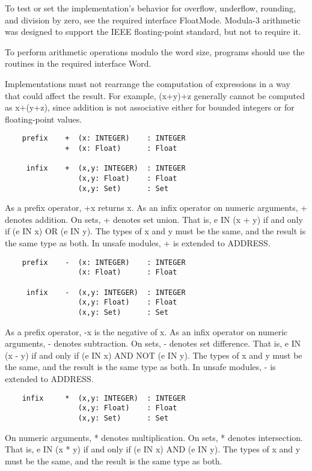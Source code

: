 \documentclass[10pt]{article}
\begin{document}
To test or set the implementation's behavior for overflow, underflow,
rounding, and division by zero, see the required interface FloatMode. Modula-3
arithmetic was designed to support the IEEE floating-point standard, but not
to require it.

To perform arithmetic operations modulo the word size, programs should use the
routines in the required interface Word.

Implementations must not rearrange the computation of expressions in a way
that could affect the result. For example, (x+y)+z generally cannot be
computed as x+(y+z), since addition is not associative either for bounded
integers or for floating-point values.

\begin{verbatim}
    prefix    +  (x: INTEGER)    : INTEGER
              +  (x: Float)      : Float

     infix    +  (x,y: INTEGER)  : INTEGER
                 (x,y: Float)    : Float
                 (x,y: Set)      : Set
\end{verbatim}
As a prefix operator, +x returns x. As an infix operator on numeric arguments,
+ denotes addition. On sets, + denotes set union. That is, e IN (x + y) if and
only if (e IN x) OR (e IN y). The types of x and y must be the same, and the
result is the same type as both. In unsafe modules, + is extended to ADDRESS.

\begin{verbatim}
    prefix    -  (x: INTEGER)    : INTEGER
                 (x: Float)      : Float

     infix    -  (x,y: INTEGER)  : INTEGER
                 (x,y: Float)    : Float
                 (x,y: Set)      : Set
\end{verbatim}
As a prefix operator, -x is the negative of x. As an infix operator on numeric
arguments, - denotes subtraction. On sets, - denotes set difference. That is,
e IN (x - y) if and only if (e IN x) AND NOT (e IN y). The types of x and y
must be the same, and the result is the same type as both. In unsafe modules,
- is extended to ADDRESS.

\begin{verbatim}
    infix     *  (x,y: INTEGER)  : INTEGER
                 (x,y: Float)    : Float
                 (x,y: Set)      : Set
\end{verbatim}
On numeric arguments, * denotes multiplication. On sets, * denotes
intersection. That is, e IN (x * y) if and only if (e IN x) AND (e IN y). The
types of x and y must be the same, and the result is the same type as both.
\end{document}
